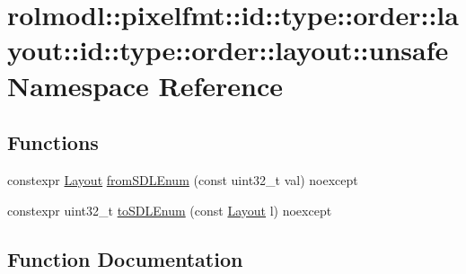 \hypertarget{namespacerolmodl_1_1pixelfmt_1_1id_1_1type_1_1order_1_1layout_1_1id_1_1type_1_1order_1_1layout_1_1unsafe}{}\section{rolmodl\+::pixelfmt\+::id\+::type\+::order\+::layout\+::id\+::type\+::order\+::layout\+::unsafe Namespace Reference}
\label{namespacerolmodl_1_1pixelfmt_1_1id_1_1type_1_1order_1_1layout_1_1id_1_1type_1_1order_1_1layout_1_1unsafe}
\subsection*{Functions}
\begin{DoxyCompactItemize}
\item 
constexpr \mbox{\hyperlink{namespacerolmodl_1_1pixelfmt_1_1id_1_1type_1_1order_a4177275b82f1923d1a2f07e1f87f0391}{Layout}} \mbox{\hyperlink{namespacerolmodl_1_1pixelfmt_1_1id_1_1type_1_1order_1_1layout_1_1id_1_1type_1_1order_1_1layout_1_1unsafe_ad7fa79db6a8f071c1d98d1a3f85c8db9}{from\+S\+D\+L\+Enum}} (const uint32\+\_\+t val) noexcept
\item 
constexpr uint32\+\_\+t \mbox{\hyperlink{namespacerolmodl_1_1pixelfmt_1_1id_1_1type_1_1order_1_1layout_1_1id_1_1type_1_1order_1_1layout_1_1unsafe_ad06b3d3abf871aec4ce7aec17a55a516}{to\+S\+D\+L\+Enum}} (const \mbox{\hyperlink{namespacerolmodl_1_1pixelfmt_1_1id_1_1type_1_1order_a4177275b82f1923d1a2f07e1f87f0391}{Layout}} l) noexcept
\end{DoxyCompactItemize}


\subsection{Function Documentation}
\mbox{\label{namespacerolmodl_1_1pixelfmt_1_1id_1_1type_1_1order_1_1layout_1_1id_1_1type_1_1order_1_1layout_1_1unsafe_ad7fa79db6a8f071c1d98d1a3f85c8db9}} 
